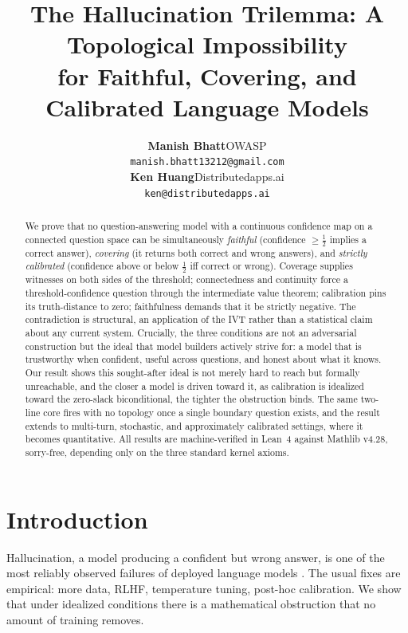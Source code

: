 \documentclass[10pt]{article}
\title{The Hallucination Trilemma: A Topological Impossibility\\
       for Faithful, Covering, and Calibrated Language Models}
\author{%
  \normalfont\centering
  \textbf{Manish Bhatt}\quad OWASP\\
  \texttt{manish.bhatt13212@gmail.com}\\[6pt]
  \textbf{Ken Huang}\quad Distributedapps.ai\\
  \texttt{ken@distributedapps.ai}%
}
\begin{document}
\maketitle

\begin{abstract}
We prove that no question-answering model with a continuous confidence map
on a connected question space can be simultaneously \emph{faithful}
(confidence $\geq\tfrac12$ implies a correct answer), \emph{covering} (it
returns both correct and wrong answers), and \emph{strictly calibrated}
(confidence above or below $\tfrac12$ iff correct or wrong). Coverage supplies
witnesses on both sides of the threshold; connectedness and continuity force
a threshold-confidence question through the intermediate value theorem;
calibration pins its truth-distance to zero; faithfulness demands that it be
strictly negative. The contradiction is structural, an application of the IVT
rather than a statistical claim about any current system. Crucially, the three
conditions are not an adversarial construction but the ideal that model
builders actively strive for: a model that is trustworthy when confident,
useful across questions, and honest about what it knows. Our result shows this
sought-after ideal is not merely hard to reach but formally unreachable, and
the closer a model is driven toward it, as calibration is idealized toward the
zero-slack biconditional, the tighter the obstruction binds. The same two-line
core fires with no topology once a single boundary question exists, and the
result extends to multi-turn, stochastic, and approximately calibrated
settings, where it becomes quantitative. All results are machine-verified in
Lean~4 against Mathlib v4.28, sorry-free, depending only on the three standard
kernel axioms.
\end{abstract}

\section{Introduction}
\label{sec:intro}

Hallucination, a model producing a confident but wrong answer, is one of the
most reliably observed failures of deployed language models
\citep{maynez2020faithfulness,ji2023survey,zhang2023siren}. The usual fixes
are empirical: more data, RLHF, temperature tuning, post-hoc calibration.
We show that under idealized conditions there is a mathematical obstruction
that no amount of training removes.
\end{document}
